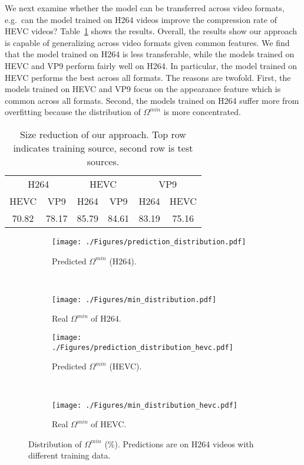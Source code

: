 \documentclass[journal,transmag]{IEEEtran}
\begin{document}
We next examine whether the model can be transferred across video formats,
e.g.~can the model trained on H264 videos improve the compression rate of HEVC videos?
Table~\ref{tab:transcode} shows the results.  
Overall, the results show our approach is capable of generalizing across video formats given common features.  We find that the model trained on H264 is less transferable,
while the models trained on HEVC and VP9 perform fairly well on H264.
In particular, the model trained on HEVC performs the best across all formats.
The reasons are twofold.
First, the models trained on HEVC and VP9 focus on the appearance feature which is common across all formats.
Second, the models trained on H264 suffer more from overfitting because the distribution of $\Omega^{min}$ is more concentrated.

\begin{table}[t]
    \small
    \center
    \begin{tabular}{cccccc}
    \toprule
        \multicolumn{2}{c}{H264} & \multicolumn{2}{c}{HEVC} & \multicolumn{2}{c}{VP9}\\
        \cmidrule(lr){1-2} \cmidrule(lr){3-4} \cmidrule(lr){5-6}
        HEVC & VP9 & H264 & VP9 & H264 & HEVC\\
        \midrule
        70.82 & 78.17 & 85.79 & 84.61 & 83.19 & 75.16 \\
    \bottomrule
    \end{tabular}
    \caption{
        Size reduction of our approach. Top row indicates training source, second row is test sources.
    }
    \label{tab:transcode}
\end{table}\begin{figure}[t]
    \center
    \begin{subfigure}[c]{0.48\linewidth}
        \centering
        \texttt{[image: ./Figures/prediction\_distribution.pdf]}
        \caption{
            Predicted $\Omega^{min}$ (H264).
        }
    \end{subfigure}
    ~
    \begin{subfigure}[c]{0.48\linewidth}
        \centering
        \texttt{[image: ./Figures/min\_distribution.pdf]}
        \caption{
            Real $\Omega^{min}$ of H264.
        }
    \end{subfigure}
    \begin{subfigure}[c]{0.48\linewidth}
        \centering
        \texttt{[image: ./Figures/prediction\_distribution\_hevc.pdf]}
        \caption{
            Predicted $\Omega^{min}$ (HEVC).
        }
    \end{subfigure}
    ~
    \begin{subfigure}[c]{0.48\linewidth}
        \centering
        \texttt{[image: ./Figures/min\_distribution\_hevc.pdf]}
        \caption{
            Real $\Omega^{min}$ of HEVC.
        }
    \end{subfigure}
    \caption{
        Distribution of $\Omega^{min}$ (\%).
        Predictions are on H264 videos with different training data.
    }
    \label{fig:prediction_distribution}
\end{figure}
\end{document}
